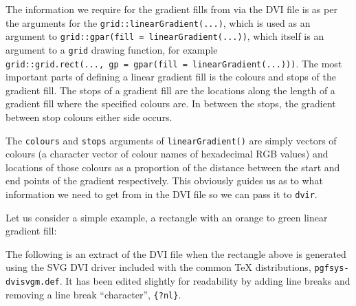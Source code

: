 \documentclass[]{article}
\begin{document}
The information we require for the gradient fills from \Tikz{} via the
DVI file is as per the arguments for the
\texttt{grid::linearGradient(...)}, which is used as an argument to
\texttt{grid::gpar(fill\ =\ linearGradient(...))}, which itself is an
argument to a \texttt{grid} drawing function, for example
\texttt{grid::grid.rect(...,\ gp\ =\ gpar(fill\ =\ linearGradient(...)))}.
The most important parts of defining a linear gradient fill is the
colours and stops of the gradient fill. The stops of a gradient fill are
the locations along the length of a gradient fill where the specified
colours are. In between the stops, the gradient between stop colours
either side occurs.

The \texttt{colours} and \texttt{stops} arguments of
\texttt{linearGradient()} are simply vectors of colours (a character
vector of colour names of hexadecimal RGB values) and locations of those
colours as a proportion of the distance between the start and end points
of the gradient respectively. This obviously guides us as to what
information we need to get from \Tikz{} in the DVI file so we can pass
it to \texttt{dvir}.

Let us consider a simple example, a rectangle with an orange to green
linear gradient fill:

\begin{figure}
\centering
{}
\end{figure}

The following is an extract of the DVI file when the rectangle above is
generated using the SVG DVI driver included with the common \TeX{}
distributions, \texttt{pgfsys-dvisvgm.def}. It has been edited slightly
for readability by adding line breaks and removing a line break
``character'', \texttt{\{?nl\}}.
\end{document}
